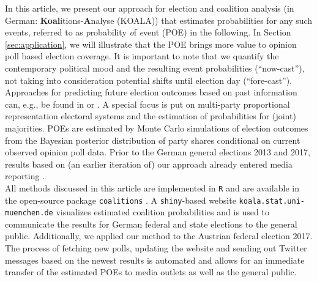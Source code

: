 \documentclass[smallextended]{svjour3}      %
\begin{document}
In this article, we present our approach for election and coalition analysis
(in German: \textbf{Koal}itions-\textbf{A}nalyse (KOALA)) that estimates probabilities
for any such events, referred to as \emph{p}robability \emph{o}f \emph{e}vent (POE)
in the following. In Section \ref{sec:application}, we will illustrate that the
POE brings more value to opinion poll based election coverage.
It is important to note that we quantify the contemporary political mood
and the resulting event probabilities (``now-cast''), not taking into consideration
potential shifts until election day (``fore-cast''). Approaches for predicting
future election outcomes based on past information can, e.g., be found in
\citet{graefe_2017} or \citet{norpoth_gschwend_2010}. A special focus is put on
multi-party proportional representation electoral systems and the estimation
of probabilities for (joint) majorities. POEs are estimated by Monte Carlo
simulations of election outcomes from the Bayesian posterior distribution of party
shares conditional on current observed opinion poll data. Prior to the German general
elections 2013 and 2017, results based on (an earlier iteration of) our approach
already entered media reporting \citep[cf.][]{wahlistik_2013, gelitz_2017}.\\

All methods discussed in this article are implemented in \texttt{R} \citep{r_2017}
and are available in the open-source package \texttt{coalitions} \citep{bender_bauer_2018}.
A \texttt{shiny}-based \citep{chang_2017} website
\texttt{koala.stat.uni-\allowbreak muenchen.\allowbreak de} visualizes estimated
coalition probabilities and is used to communicate the results for German federal
and state elections to the general public. Additionally, we applied our method
to the Austrian federal election 2017. The process of fetching new polls,
updating the website and sending out Twitter messages based on the newest results
is automated and allows for an immediate transfer of the estimated POEs
to media outlets as well as the general public.
\end{document}
